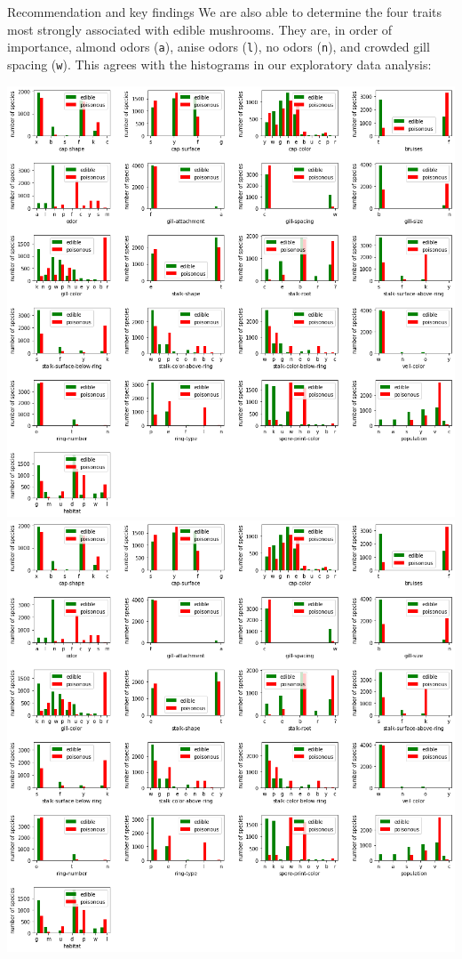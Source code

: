 \documentclass{beamer}
\begin{document}
\begin{frame}{Recommendation and key findings}
We are also able to determine the four traits most strongly
associated with edible mushrooms. They are, in order of importance, almond
odors (\texttt{a}), anise odors (\texttt{l}), no odors (\texttt{n}), and
crowded gill spacing (\texttt{w}).
This agrees with the histograms in our exploratory data analysis:
\begin{center}
\includegraphics[scale=0.6,trim=0 575 680 145,clip=true]{histograms.png}
\includegraphics[scale=0.6,trim=460 575 220 145,clip=true]{histograms.png}
\end{center}
\end{frame}
\end{document}
